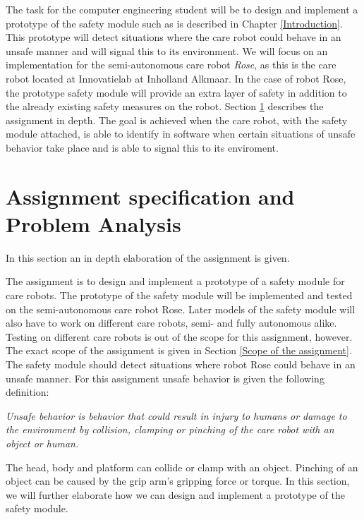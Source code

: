\documentclass[12pt]{scrreprt}
\begin{document}
The task for the computer engineering student will be to design and implement a prototype of the safety module such as is described in Chapter \ref{Introduction}. This prototype will detect situations where the care robot could behave in an unsafe manner and will signal this to its environment. We will focus on an implementation for the semi-autonomous care robot \textit{Rose}, as this is the care robot located at Innovatielab at Inholland Alkmaar. In the case of robot Rose, the prototype safety module will provide an extra layer of safety in addition to the already existing safety measures on the robot. Section \ref{Assignment specification} describes the assignment in depth. 
 The goal is achieved when the care robot, with the safety module attached, is able to identify in software when certain situations of unsafe behavior take place and is able to signal this to its enviroment.
 
\section{Assignment specification and Problem Analysis}
\label{Assignment specification}

In this section an in depth elaboration of the assignment is given.
\par
The assignment is to design and implement a prototype of a safety module for care robots. The prototype of the safety module will be implemented and tested on the semi-autonomous care robot Rose. Later models of the safety module will also have to work on different care robots, semi- and fully autonomous alike. Testing on different care robots is out of the scope for this assignment, however. The exact scope of the assignment is given in Section \ref{Scope of the assignment}. The safety module should detect situations where robot Rose could behave in an unsafe manner. For this assignment unsafe behavior is given the following definition:
\begin{flushleft}
\textit{
Unsafe behavior is behavior that could result in injury to humans or damage to the environment by collision, clamping or pinching of the care robot with an object or human.
}
\end{flushleft}
The head, body and platform can collide or clamp with an object. Pinching of an object can be caused by the grip arm's gripping force or torque.  In this section, we will further elaborate how we can design and implement a prototype of the safety module. \\
 
\end{document}
